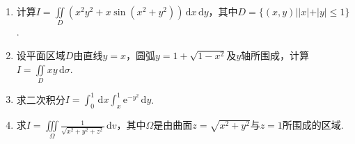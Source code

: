 \documentclass[../Main.tex]{subfiles}
\begin{document}
\begin{enumerate}
    \item 计算$I=\iint\limits_{D}\left(x^{2}y^{2}+x\sin\left(x^{2}+y^{2}\right)\right
              )\,\mathrm{d}x\,\mathrm{d}y$，其中$D=\{(x,y)||x|+|y|\leq 1\}$.
          \vspace{12em}

    \item 设平面区域$D$由直线$y=x$，圆弧$y=1+\sqrt{1-x^{2}}$及$y$轴所围成，计算$I
              =\iint\limits_{D}xy\,\mathrm{d}\sigma$.
          \vspace{11em}

    \item 求二次积分$I=\int_{0}^{1}\,\mathrm{d}x\int_{x}^{1}\mathrm{e}^{-y^{2}}\,\mathrm{d}
              y$.
          \vspace{11em}

    \item 求$I=\iiint\limits_{\Omega}\frac{1}{\sqrt{x^{2}+y^{2}+z^{2}}}\,\mathrm{d}
              v$，其中$\Omega$是由曲面$z=\sqrt{x^{2}+y^{2}}$与$z=1$所围成的区域.
          \vspace{11em}
\end{enumerate}
\end{document}

